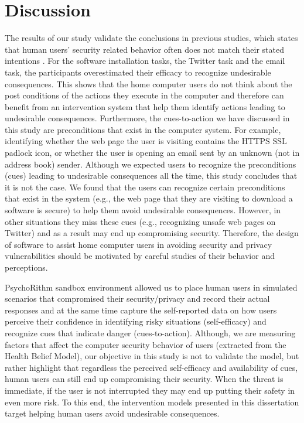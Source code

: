 \section{Discussion}
The results of our study validate the conclusions in previous studies, which states that human users' security related behavior often does not match their stated intentions \cite{davinson2010, govani2005, national2010}. 
For the software installation tasks, the Twitter task and the email task, the participants overestimated their efficacy to recognize undesirable consequences. This shows that the home computer users do not think about the post conditions of the actions they execute in the computer and therefore can benefit from an intervention system that help them identify actions leading to undesirable consequences.
Furthermore, the cues-to-action we have discussed in this study are preconditions that exist in the computer system. For example, identifying whether the web page the user is visiting contains the HTTPS SSL padlock icon, or whether the user is opening an email sent by an unknown (not in address book) sender. Although we expected users to recognize the preconditions (cues) leading to undesirable consequences all the time, this study concludes that it is not the case. We found that the users can recognize certain preconditions that exist in the system (e.g., the web page that they are visiting to download a software is secure) to help them avoid undesirable consequences. However, in other situations they miss these cues (e.g., recognizing unsafe web pages on Twitter) and as a result may end up compromising security.
Therefore, the design of software to assist home computer users in avoiding security and privacy vulnerabilities should be motivated by careful studies of their behavior and perceptions.

PsychoRithm sandbox environment allowed us to place human users in simulated scenarios that compromised their security/privacy and record their actual responses and at the same time capture the self-reported data on how users perceive their confidence in identifying risky situations (self-efficacy) and recognize cues that indicate danger (cues-to-action). Although, we are measuring factors that affect the computer security behavior of users (extracted from the Health Belief Model), our objective in this study is not to validate the model, but rather highlight that regardless the perceived self-efficacy and availability of cues, human users can still end up compromising their security. 
When the threat is immediate, if the user is not interrupted they may end up putting their safety in even more risk. 
To this end, the intervention models presented in this dissertation target helping human users avoid undesirable consequences.

